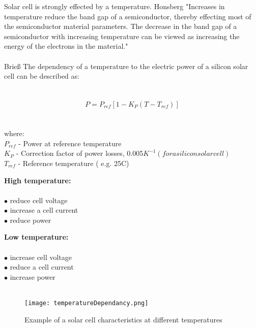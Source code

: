Solar cell is strongly effected by a temperature. Honsberg\cite{5} "Increases in temperature reduce the band gap of a semiconductor, thereby effecting most of the semiconductor material parameters. The decrease in the band gap of a semiconductor with increasing temperature can be viewed as increasing the energy of the electrons in the material."\\
\\
Brieß\cite{6} The dependency of a temperature to the electric power of a silicon solar cell can be described as:\\ \\ \\

\begin{equation}
P = P_{ref} [ 1 - K_{P} ( T - T_{ref}) ]
\end{equation}
	\\
	\\
where:\\
     $P_{ref}$ - Power at reference temperature\\
     $K_{P}$ - Correction factor of power losses, 0.005$K^{-1}(for a silicon solar cell)$\\
     $T_{ref}$ - Reference temperature ( e.g. 25\textdegree{}C)\\
     
     

\begin{multicols}{2}
	\textbf{High  temperature:} \\ \\
	$\bullet$ reduce cell voltage \\
	$\bullet$ increase a cell current\\
	$\bullet$ reduce power\\
	

	\columnbreak
	
	\textbf{Low temperature:}\\ \\
	$\bullet$ increase cell voltage\\
	$\bullet$ reduce a cell current\\
	$\bullet$ increase power\\
	\\
\end{multicols}


	\begin{figure}[h]
		\centering
		\texttt{[image: temperatureDependancy.png]}
		\caption{ Example of a solar cell characteristics at different temperatures\cite{6} }
		\label{fig: EPS11}
	\end{figure}
	
